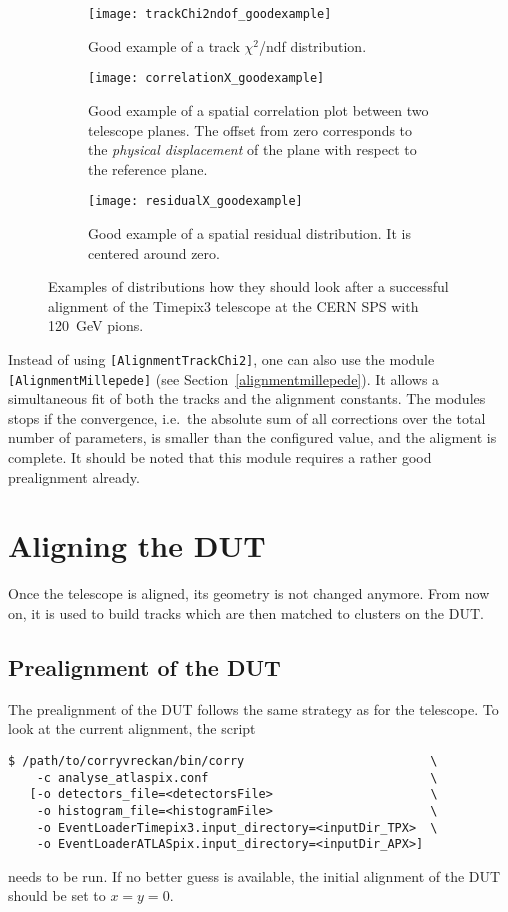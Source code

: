 \begin{figure}
    \centering
    \begin{subfigure}[t]{0.66\textwidth}
        \texttt{[image: trackChi2ndof\_goodexample]}
        \caption{Good example of a track $\chi^2$/ndf distribution.}
        \label{fig:trackChi2}
    \end{subfigure}
    \begin{subfigure}[t]{0.66\textwidth}
        \texttt{[image: correlationX\_goodexample]}
        \caption{Good example of a spatial correlation plot between two telescope planes. The offset from zero corresponds to the \emph{physical displacement} of the plane  with respect to the reference plane.}
        \label{fig:correlationX}
    \end{subfigure}
    \begin{subfigure}[t]{0.66\textwidth}
        \texttt{[image: residualX\_goodexample]}
        \caption{Good example of a spatial residual distribution. It is centered around zero.}
        \label{fig:residualX}
    \end{subfigure}
    \caption{Examples of distributions how they should look after a successful alignment of the Timepix3 telescope at the CERN SPS with \SI{120}{\GeV} pions.}
    \label{fig:exampleAlignment}
\end{figure}

Instead of using \texttt{[AlignmentTrackChi2]}, one can also use the module \texttt{[AlignmentMillepede]} (see Section~\ref{alignmentmillepede}).
It allows a simultaneous fit of both the tracks and the alignment constants.
The modules stops if the convergence, i.e.~the absolute sum of all corrections over the total number of parameters, is smaller than the configured value, and the aligment is complete.
It should be noted that this module requires a rather good prealignment already.

\section{Aligning the DUT}
\label{sec:align_dut}
Once the telescope is aligned, its geometry is not changed anymore. From now on, it is used to build tracks which are then matched to clusters on the DUT.

\subsection*{Prealignment of the DUT}
The prealignment of the DUT follows the same strategy as for the telescope. To look at the current alignment, the script
\begin{verbatim}
$ /path/to/corryvreckan/bin/corry                          \
    -c analyse_atlaspix.conf                               \
   [-o detectors_file=<detectorsFile>                      \
    -o histogram_file=<histogramFile>                      \
    -o EventLoaderTimepix3.input_directory=<inputDir_TPX>  \
    -o EventLoaderATLASpix.input_directory=<inputDir_APX>]
\end{verbatim}
needs to be run.
If no better guess is available, the initial alignment of the DUT should be set to $x=y=0$.

